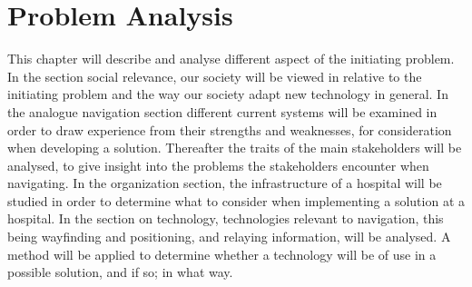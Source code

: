 \chapter{Problem Analysis} \label{cha:problem_analysis}
This chapter will describe and analyse different aspect of the initiating problem. In the section social relevance, our society will be viewed in relative to the initiating problem and the way our society adapt new technology in general. In the analogue navigation section different current systems will be examined in order to draw experience from their strengths and weaknesses, for consideration when developing a solution. Thereafter the traits of the main stakeholders will be analysed, to give insight into the problems the stakeholders encounter when navigating. In the organization section, the infrastructure of a hospital will be studied in order to determine what to consider when implementing a solution at a hospital. In the section on technology, technologies relevant to navigation, this being wayfinding and positioning, and relaying information, will be analysed. A method will be applied to determine whether a technology will be of use in a possible solution, and if so; in what way. 













